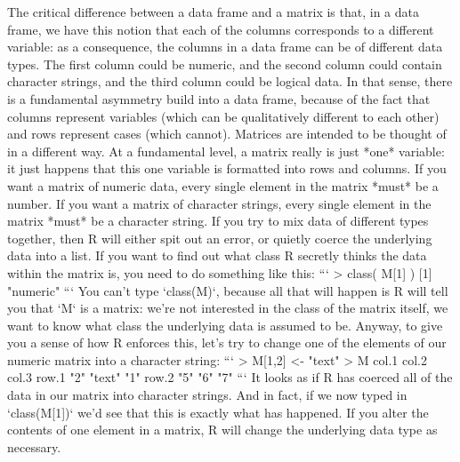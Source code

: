 The critical difference between a data frame and a matrix is that, in a data frame, we have this notion that each of the columns corresponds to a different variable: as a consequence, the columns in a data frame can be of different data types. The first column could be numeric, and the second column could contain character strings, and the third column could be logical data. In that sense, there is a fundamental asymmetry build into a data frame, because of the fact that columns represent variables (which can be qualitatively different to each other) and rows represent cases (which cannot). Matrices are intended to be thought of in a different way. At a fundamental level, a matrix really is just *one* variable: it just happens that this one variable is formatted into rows and columns. If you want a matrix of numeric data, every single element in the matrix *must* be a number. If you want a matrix of character strings, every single element in the matrix *must* be a character string. If you try to mix data of different types together, then R will either spit out an error, or quietly coerce the underlying data into a list. If you want to find out what class R secretly thinks the data within the matrix is, you need to do something like this: 
```
> class( M[1] )
[1] "numeric"
```
You can't type `class(M)`, because all that will happen is R will tell you that `M` is a matrix: we're not interested in the class of the matrix itself, we want to know what class the underlying data is assumed to be. Anyway, to give you a sense of how R enforces this, let's try to change one of the elements of our numeric matrix into a character string:
```
> M[1,2] <- "text"
> M
      col.1 col.2  col.3
row.1 "2"   "text" "1"  
row.2 "5"   "6"    "7" 
```
It looks as if R has coerced all of the data in our matrix into character strings. And in fact, if we now typed in `class(M[1])` we'd see that this is exactly what has happened. If you alter the contents of one element in a matrix, R will change the underlying data type as necessary. 

